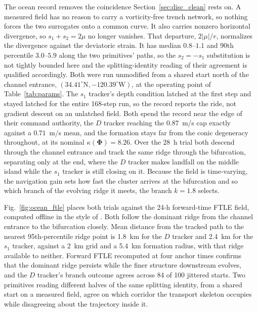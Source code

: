 \documentclass[lettersize,journal]{IEEEtran}
\begin{document}
The ocean record removes the coincidence Section~\ref{sec:disc_clean} rests
on. A measured field has no reason to carry a vorticity-free trench
network, so nothing forces the two surrogates
onto a common curve. It also carries nonzero horizontal divergence, so $s_1 + s_2 = 2\mu$ no
longer vanishes. That departure, $2|\mu|/r$, normalizes the divergence against the deviatoric strain. It has median $0.8$--$1.1$ and 90th percentile $3.0$--$5.9$ along the two primitives' paths, so the $s_2 = -s_1$ substitution is not tightly bounded here and the splitting-identity reading of their agreement is qualified accordingly.
Both were run unmodified from a shared start north of the channel
entrance, $(34.41^{\circ}\mathrm{N}, -120.39^{\circ}\mathrm{W})$, at
the operating point of Table~\ref{tab:params}. The $s_1$ tracker's
depth condition latched at the first step and stayed latched for the
entire 168-step run, so the record reports the ride, not gradient descent on an unlatched field. Both spend the record near the edge
of their command authority, the $D$ tracker reaching the $0.87$~m/s cap
exactly against a $0.71$~m/s mean, and the formation stays far from the
conic degeneracy throughout, at its nominal $\kappa(\boldsymbol{\Phi}) = 8.26$. Over the 28~h trial both descend through the channel entrance and track the same ridge through the bifurcation, separating only at the end, where the $D$ tracker makes landfall on the middle island while the $s_1$ tracker is still closing on it.
Because the field is time-varying, the navigation gain sets how fast
the cluster arrives at the bifurcation and so which branch of the
evolving ridge it meets, the branch $k = 1.8$ selects.

Fig.~\ref{fig:ocean_ftle} places both trials against the 24-h forward-time
FTLE field, computed offline in the style of
\cite{11}. Both follow the dominant ridge from the channel entrance to the
bifurcation closely. Mean distance from the tracked path to the nearest
95th-percentile ridge point is 1.8~km for the $D$ tracker and 2.4~km
for the $s_1$ tracker, against a 2~km grid and a 5.4~km formation
radius, with that ridge available to neither. Forward
FTLE recomputed at four anchor times confirms that the dominant ridge
persists while the finer structure downstream evolves, and the $D$
tracker's branch outcome agrees across 84 of 100 jittered starts.
Two primitives reading different halves of the
same splitting identity, from a shared start on a measured field, agree
on which corridor the transport skeleton occupies while disagreeing
about the trajectory inside it.
\end{document}
